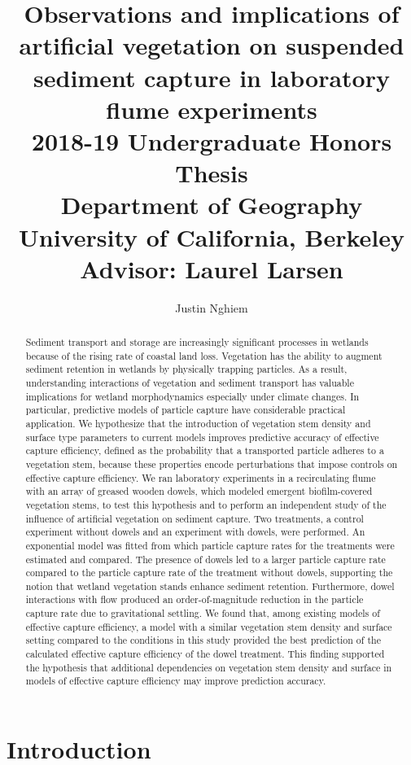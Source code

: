 \documentclass[12pt]{article}
\title{%
Observations and implications of artificial vegetation on suspended sediment capture in laboratory flume experiments \\
\bigskip
\large 2018-19 Undergraduate Honors Thesis \\
\large Department of Geography \\
\large University of California, Berkeley \\
Advisor: Laurel Larsen}
\author{Justin Nghiem}
\date{}
\begin{document}
\maketitle

\begin{abstract}
    Sediment transport and storage are increasingly significant processes in wetlands because of the rising rate of coastal land loss. Vegetation has the ability to augment sediment retention in wetlands by physically trapping particles. As a result, understanding interactions of vegetation and sediment transport has valuable implications for wetland morphodynamics especially under climate changes. In particular, predictive models of particle capture have considerable practical application. We hypothesize that the introduction of vegetation stem density and surface type parameters to current models improves predictive accuracy of effective capture efficiency, defined as the probability that a transported particle adheres to a vegetation stem, because these properties encode perturbations that impose controls on effective capture efficiency. We ran laboratory experiments in a recirculating flume with an array of greased wooden dowels, which modeled emergent biofilm-covered vegetation stems, to test this hypothesis and to perform an independent study of the influence of artificial vegetation on sediment capture. Two treatments, a control experiment without dowels and an experiment with dowels, were performed. An exponential model was fitted from which particle capture rates for the treatments were estimated and compared. The presence of dowels led to a larger particle capture rate compared to the particle capture rate of the treatment without dowels, supporting the notion that wetland vegetation stands enhance sediment retention. Furthermore, dowel interactions with flow produced an order-of-magnitude reduction in the particle capture rate due to gravitational settling. We found that, among existing models of effective capture efficiency, a model with a similar vegetation stem density and surface setting compared to the conditions in this study provided the best prediction of the calculated effective capture efficiency of the dowel treatment. This finding supported the hypothesis that additional dependencies on vegetation stem density and surface in models of effective capture efficiency may improve prediction accuracy.
\end{abstract}

\pagebreak

\section{Introduction}
\end{document}
